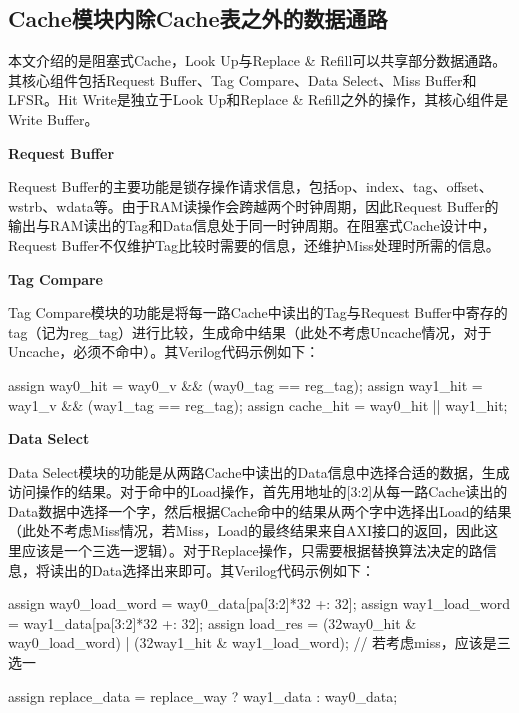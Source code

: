 \subsection{Cache模块内除Cache表之外的数据通路}\label{sec:09-cache-014}

本文介绍的是阻塞式Cache，Look Up与Replace \& Refill可以共享部分数据通路。其核心组件包括Request Buffer、Tag Compare、Data Select、Miss Buffer和LFSR。Hit Write是独立于Look Up和Replace \& Refill之外的操作，其核心组件是Write Buffer。

\textbf{Request Buffer}

Request Buffer的主要功能是锁存操作请求信息，包括op、index、tag、offset、wstrb、wdata等。由于RAM读操作会跨越两个时钟周期，因此Request Buffer的输出与RAM读出的Tag和Data信息处于同一时钟周期。在阻塞式Cache设计中，Request Buffer不仅维护Tag比较时需要的信息，还维护Miss处理时所需的信息。

\textbf{Tag Compare}

Tag Compare模块的功能是将每一路Cache中读出的Tag与Request Buffer中寄存的tag（记为reg\_tag）进行比较，生成命中结果（此处不考虑Uncache情况，对于Uncache，必须不命中）。其Verilog代码示例如下：

\begin{CodeBlock}[language=BookVerilog]
assign way0_hit = way0_v && (way0_tag == reg_tag);
assign way1_hit = way1_v && (way1_tag == reg_tag);
assign cache_hit = way0_hit || way1_hit;
\end{CodeBlock}

\textbf{Data Select}

Data Select模块的功能是从两路Cache中读出的Data信息中选择合适的数据，生成访问操作的结果。对于命中的Load操作，首先用地址的{[}3:2{]}从每一路Cache读出的Data数据中选择一个字，然后根据Cache命中的结果从两个字中选择出Load的结果（此处不考虑Miss情况，若Miss，Load的最终结果来自AXI接口的返回，因此这里应该是一个三选一逻辑）。对于Replace操作，只需要根据替换算法决定的路信息，将读出的Data选择出来即可。其Verilog代码示例如下：

\begin{CodeBlock}[language=BookVerilog]
assign way0_load_word = way0_data[pa[3:2]*32 +: 32];
assign way1_load_word = way1_data[pa[3:2]*32 +: 32];
assign load_res = ({32{way0_hit}} & way0_load_word) | ({32{way1_hit}} & way1_load_word); 
// 若考虑miss，应该是三选一

assign replace_data = replace_way ? way1_data : way0_data;
\end{CodeBlock}

